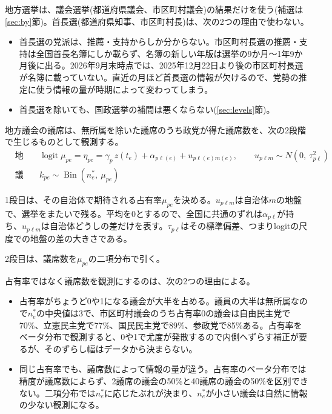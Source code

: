 \documentclass[a4paper,11pt]{ltjsarticle}
\begin{document}
地方選挙は、議会選挙(都道府県議会、市区町村議会)の結果だけを使う(補選は\ref{sec:by}節)。首長選(都道府県知事、市区町村長)は、次の2つの理由で使わない。
\begin{itemize}
  \item 首長選の党派は、推薦・支持からしか分からない。市区町村長選の推薦・支持は全国首長名簿にしか載らず、名簿の新しい年版は選挙の9か月〜1年9か月後に出る。2026年9月末時点では、2025年12月22日より後の市区町村長選が名簿に載っていない。直近の月ほど首長選の情報が欠けるので、党勢の推定に使う情報の量が時期によって変わってしまう。
  \item 首長選を除いても、国政選挙の補間は悪くならない(\ref{sec:levels}節)。
\end{itemize}

地方議会の議席は、無所属を除いた議席のうち政党が得た議席数を、次の2段階で生じるものとして観測する。
\begin{align}
  &\text{地盤:} &&\operatorname{logit}\mu_{pe} = \eta_{pe} = \gamma_p\,z(t_e) + \alpha_{p\ell(e)} + u_{p\ell(e)m(e)},\qquad u_{p\ell m}\sim N(0,\ \tau^2_{p\ell}) \label{eq:stage1}\\
  &\text{議席を数える偶然:} &&k_{pe}\sim\operatorname{Bin}(n^\ast_e,\ \mu_{pe}) \label{eq:local}
\end{align}

1段目は、その自治体で期待される占有率$\mu_{pe}$を決める。$u_{p\ell m}$は自治体$m$の地盤で、選挙をまたいで残る。平均を0とするので、全国に共通のずれは$\alpha_{p\ell}$が持ち、$u_{p\ell m}$は自治体どうしの差だけを表す。$\tau_{p\ell}$はその標準偏差、つまりlogitの尺度での地盤の差の大きさである。

2段目は、議席数を$\mu_{pe}$の二項分布で引く。

占有率ではなく議席数を観測にするのは、次の2つの理由による。

\begin{itemize}
  \item 占有率がちょうど0や1になる議会が大半を占める。議員の大半は無所属なので$n^\ast_e$の中央値は3で、市区町村議会のうち占有率0の議会は自由民主党で70\%、立憲民主党で77\%、国民民主党で89\%、参政党で85\%ある。占有率をベータ分布で観測すると、0や1で尤度が発散するので内側へずらす補正が要るが、そのずらし幅はデータから決まらない。
  \item 同じ占有率でも、議席数によって情報の量が違う。占有率のベータ分布では精度が議席数によらず、2議席の議会の50\%と40議席の議会の50\%を区別できない。二項分布では$n^\ast_e$に応じたぶれが決まり、$n^\ast_e$が小さい議会は自然に情報の少ない観測になる。
\end{itemize}
\end{document}
